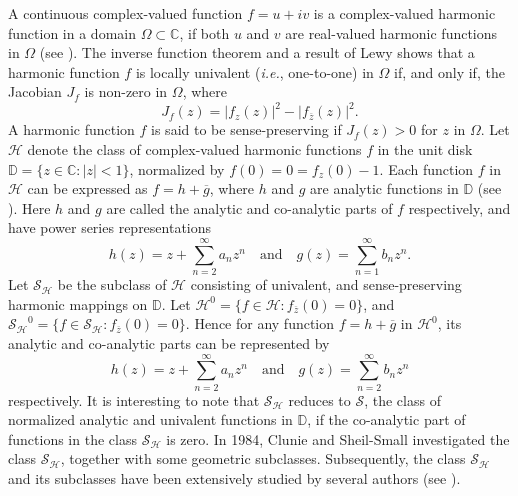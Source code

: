 \documentclass[a4paper,12pt]{amsart}
\theoremstyle{plain}
\theoremstyle{definition}
\begin{document}
A continuous complex-valued function $f = u + iv $ is a complex-valued harmonic function in a domain $\Omega \subset \mathbb{C}$,  if both $u$ and $v$ are real-valued harmonic functions in $\Omega$ (see \cite{Duren-2004}). The inverse function theorem and a result of Lewy \cite{Lewy-1936} shows that a harmonic function $f$ is locally univalent ({\it{i.e.}}, one-to-one) in $\Omega$ if, and only if, the Jacobian $J_f$ is non-zero in $\Omega$, where
$$
J_f(z) = |f_z(z)|^2 -|f_{\overline{z}}(z)|^2.
$$
A harmonic function $f$ is said to be sense-preserving if $J_f(z) > 0 $ for $ z $  in  $\Omega$.
Let  $\mathcal{H}$  denote  the class of  complex-valued harmonic functions $f$ in the unit disk $\mathbb{D} = \{z \in \mathbb{C}: |z| < 1\}$, normalized by $f(0) = 0 = f_z(0)-1$. Each function $f$ in $\mathcal{H}$  can be expressed as $f = h + \overline {g}$, where $h$ and $g$ are analytic functions in $\mathbb{D}$ (see \cite{Duren-2004}). Here  $h$ and $g$ are called the analytic and co-analytic parts of $f$ respectively, and  have  power series representations
$$
h(z) = z + \sum_{n = 2}^{\infty}a_n z^n \quad \mbox{and} \quad g(z) = \sum_{n = 1}^{\infty}b_n z^n.
$$
Let $\mathcal{S_H}$ be the subclass of $\mathcal{H}$ consisting of univalent, and sense-preserving harmonic mappings on $\mathbb{D}$. Let $\mathcal{H}^0 =\{ f \in \mathcal{H} : f_{\overline{z}}(0) = 0 \}$, and $\mathcal{S_{H}}^0 = \{ f \in \mathcal{S_H} : f_{\overline{z}}(0) = 0\}$. Hence for any function $f = h + \overline{g} $ in $\mathcal{H}^0$, its analytic and co-analytic parts can be represented by
$$
h(z) = z + \sum_{n = 2}^{\infty}a_n z^n \quad \mbox{and} \quad g(z) = \sum_{n = 2}^{\infty}b_n z^n
$$
respectively. It is interesting to note that $\mathcal{S_H}$ reduces to $\mathcal{S}$, the class of normalized analytic and  univalent  functions in $\mathbb{D}$, if the co-analytic part  of functions in the class  $\mathcal{S_H}$ is zero. In 1984, Clunie and Sheil-Small {\cite{Clunie-Sheil-1984}} investigated the class $\mathcal{S_H}$, together with some  geometric subclasses.  Subsequently, the class $\mathcal{S_H}$ and its subclasses have been extensively studied by several authors
(see \cite{Bshouty-Joshi-2013, Bshouty-Lyzzaik-2011, Clunie-Sheil-1984, Kalaj-Ponnusamy-Matti-2014, Wang-Liang-2001}).\\
\end{document}
